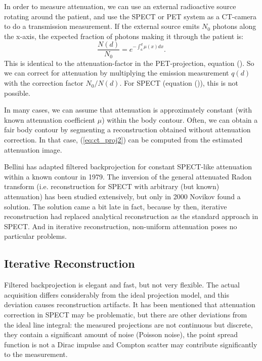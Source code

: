 In order to measure attenuation, we can use an external radioactive source
rotating around the patient, and use the SPECT or PET system as a CT-camera to
do a transmission measurement. If the external source emits $N_0$ photons
along the x-axis, the expected fraction of photons making it through the
patient is:
\begin{equation}
\frac{N(d)}{N_0} = e^{-\int_a^d \mu(x) dx} \label{eq:ct_proj2}.
\end{equation}
This is identical to the attenuation-factor in the PET-projection, equation
(). So we can correct for attenuation by multiplying the
emission measurement $q(d)$ with the correction factor $N_0 / N(d)$.
For SPECT (equation ()), this is not possible.

In many cases, we can assume that attenuation is approximately constant (with
known attenuation coefficient $\mu$) within the body contour. Often, we can
obtain a fair body contour by segmenting a reconstruction obtained without
attenuation correction. In that case, (\ref{eq:ct_proj2}) can be computed from
the estimated attenuation image.

Bellini has adapted filtered backprojection for constant SPECT-like attenuation
within a known contour in 1979. The inversion of the general attenuated Radon
transform (i.e. reconstruction for SPECT with arbitrary (but known) attenuation) has
been studied extensively, but only in 2000 Novikov found a solution. The solution
came a bit late in fact, because by then, iterative reconstruction had replaced
analytical reconstruction as the standard approach in SPECT. And in iterative
reconstruction, non-uniform attenuation poses no particular problems.

\subsection{Iterative Reconstruction \label{sec:iterrecon}}
Filtered backprojection is elegant and fast, but not very
flexible. The actual acquisition differs considerably from the ideal
projection model, and this deviation causes reconstruction
artifacts. It has been mentioned that attenuation correction in SPECT
may be problematic, but there are other deviations from the ideal line
integral: the measured projections are not continuous but discrete,
they contain a significant amount of noise (Poisson noise), the point
spread function is not a Dirac impulse and Compton scatter may
contribute significantly to the measurement.

